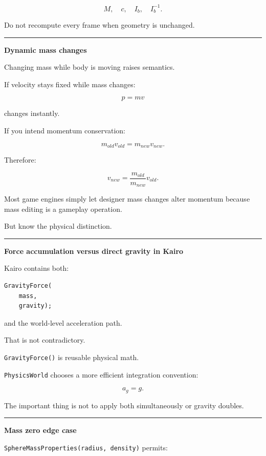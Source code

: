 \[
M,\quad
c,\quad
I_b,\quad
I_b^{-1}.
\]

Do not recompute every frame when geometry is unchanged.

\begin{center}\rule{0.5\linewidth}{0.5pt}\end{center}

\textbf{Dynamic mass changes}

Changing mass while body is moving raises semantics.

If velocity stays fixed while mass changes:

\[
p=mv
\]

changes instantly.

If you intend momentum conservation:

\[
m_{old}v_{old}
=
m_{new}v_{new}.
\]

Therefore:

\[
v_{new}
=
\frac{m_{old}}{m_{new}}
v_{old}.
\]

Most game engines simply let designer mass changes alter momentum because mass editing is a gameplay operation.

But know the physical distinction.

\begin{center}\rule{0.5\linewidth}{0.5pt}\end{center}

\textbf{Force accumulation versus direct gravity in Kairo}

Kairo contains both:

\begin{verbatim}
GravityForce(
    mass,
    gravity);
\end{verbatim}

and the world-level acceleration path.

That is not contradictory.

\texttt{GravityForce()} is reusable physical math.

\texttt{PhysicsWorld} chooses a more efficient integration convention:

\[
a_g=g.
\]

The important thing is not to apply both simultaneously or gravity doubles.

\begin{center}\rule{0.5\linewidth}{0.5pt}\end{center}

\textbf{Mass zero edge case}

\texttt{SphereMassProperties(radius,\ density)} permits:

